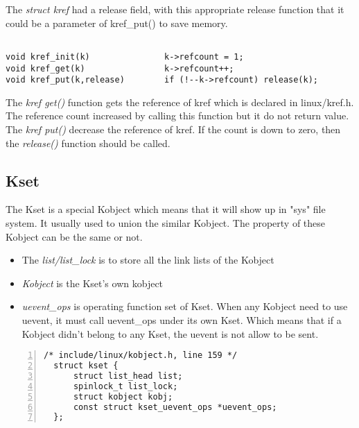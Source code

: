 \documentclass[10pt,draftclsnofoot,journal,compsoc,onecolumn]{IEEEtran}
\begin{document}
The \textit{struct kref} had a release field, with this appropriate release function that it could be a parameter of kref\_put() to save memory.

\begin{lstlisting}

void kref_init(k)               k->refcount = 1;
void kref_get(k)                k->refcount++;
void kref_put(k,release)        if (!--k->refcount) release(k);

\end{lstlisting}
The \textit{kref get()} function gets the reference of kref which is declared in linux/kref.h. The reference count increased by calling this function but it do not return value. The \textit{kref put()} decrease the reference of kref. If the count is down to zero, then the \textit{release()} function should be called.

\subsection{Kset}

\par The Kset is a special Kobject which means that it will show up in "sys" file system. It usually used to union the similar Kobject. The property of these Kobject can be the same or not.

\begin{itemize}

\item The \textit{list/list\_lock} is to store all the link lists of the Kobject

\item \textit{Kobject} is the Kset's own kobject

\item \textit{uevent\_ops} is operating function set of Kset. When any Kobject need to use uevent, it must call uevent\_ops under its own Kset. Which means that if a Kobject didn't belong to any Kset, the uevent is not allow to be sent.

\end{itemize}
\begin{lstlisting}[numbers=left]
 /* include/linux/kobject.h, line 159 */
  struct kset {
      struct list_head list;
      spinlock_t list_lock;
      struct kobject kobj;
      const struct kset_uevent_ops *uevent_ops;
  };
\end{lstlisting}
\end{document}
